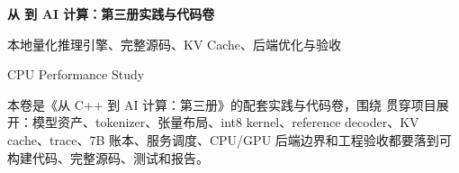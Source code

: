 \begin{titlepage}
\thispagestyle{empty}
\vspace*{2.2cm}
{\Huge\bfseries\color{BookNavy} 从 \cpp 到 AI 计算：第三册实践与代码卷\par}
\vspace{0.68cm}
{\Large\color{BookAccent} 本地量化推理引擎、完整源码、KV Cache、后端优化与验收\par}
\vspace{1.25cm}
{\large CPU Performance Study\par}
\vfill
{\small\color{BookMuted} 本卷是《从 C++ 到 AI 计算：第三册》的配套实践与代码卷，围绕  贯穿项目展开：模型资产、tokenizer、张量布局、int8 kernel、reference decoder、KV cache、trace、7B 账本、服务调度、CPU/GPU 后端边界和工程验收都要落到可构建代码、完整源码、测试和报告。\par}
\end{titlepage}
